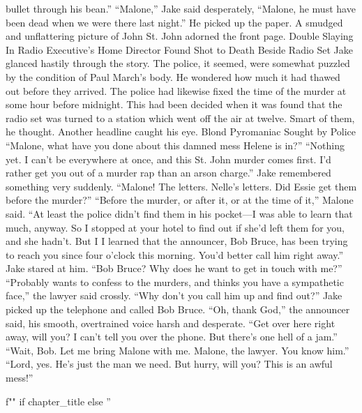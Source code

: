 \documentclass{novel}
\begin{document}
bullet through his bean.” “Malone,” Jake said desperately, “Malone, he must have been dead when we were there last night.” He picked up the paper. A smudged and unflattering picture of John St. John adorned the front page. Double Slaying In Radio Executive’s Home Director Found Shot to Death Beside Radio Set Jake glanced hastily through the story. The police, it seemed, were somewhat puzzled by the condition of Paul March’s body. He wondered how much it had thawed out before they arrived. The police had likewise fixed the time of the murder at some hour before midnight. This had been decided when it was found that the radio set was turned to a station which went off the air at twelve. Smart of them, he thought. Another headline caught his eye. Blond Pyromaniac Sought by Police “Malone, what have you done about this damned mess Helene is in?” “Nothing yet. I can’t be everywhere at once, and this St. John murder comes first. I’d rather get you out of a murder rap than an arson charge.” Jake remembered something very suddenly. “Malone! The letters. Nelle’s letters. Did Essie get them before the murder?” “Before the murder, or after it, or at the time of it,” Malone said. “At least the police didn’t find them in his pocket—I was able to learn that much, anyway. So I stopped at your hotel to find out if she’d left them for you, and she hadn’t. But I I learned that the announcer, Bob Bruce, has been trying to reach you since four o’clock this morning. You’d better call him right away.” Jake stared at him. “Bob Bruce? Why does he want to get in touch with me?” “Probably wants to confess to the murders, and thinks you have a sympathetic face,” the lawyer said crossly. “Why don’t you call him up and find out?” Jake picked up the telephone and called Bob Bruce. “Oh, thank God,” the announcer said, his smooth, overtrained voice harsh and desperate. “Get over here right away, will you? I can’t tell you over the phone. But there’s one hell of a jam.” “Wait, Bob. Let me bring Malone with me. Malone, the lawyer. You know him.” “Lord, yes. He’s just the man we need. But hurry, will you? This is an awful mess!”

\begin{ChapterStart}
\vspace{3\nbs}
f"" if chapter_title else ''
\end{ChapterStart}
\end{document}
